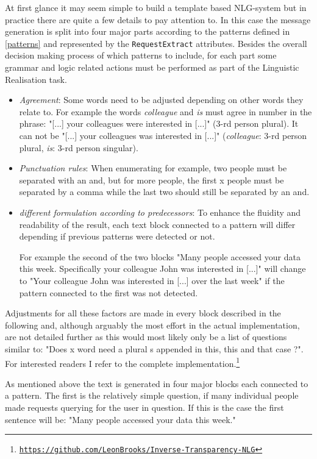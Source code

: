 \documentclass[sigconf,obeyspaces]{acmart}
\begin{document}
At first glance it may seem simple to build a template based NLG-system but in practice there are quite a few details to pay attention to. In this case the message generation is split into four major parts according to the patterns defined in \ref{patterns} and represented by the \texttt{RequestExtract} attributes. Besides the overall decision making process of which patterns to include, for each part some grammar and logic related actions must be performed as part of the Linguistic Realisation task.
\begin{itemize}
    \item \emph{Agreement}: Some words need to be adjusted depending on other words they relate to. For example the words \emph{colleague} and \emph{is} must agree in number in the phrase: "[...] your colleagues were interested in [...]" (3-rd person plural). It can not be "[...] your colleagues was interested in [...]" (\emph{colleague}: 3-rd person plural, \emph{is}: 3-rd person singular).
    \item \emph{Punctuation rules}: When enumerating for example, two people must be separated with an and, but for more people, the first x people must be separated by a comma while the last two should still be separated by an and.
    \item \emph{different formulation according to predecessors}: To enhance the fluidity and readability of the result, each text block connected to a pattern will differ depending if previous patterns were detected or not. 
    
    For example the second of the two blocks "Many people accessed your data this week. Specifically your colleague John was interested in [...]" will change to "Your colleague John was interested in [...] over the last week" if the pattern connected to the first was not detected.
\end{itemize}
Adjustments for all these factors are made in every block described in the following and, although arguably the most effort in the actual implementation,  are not detailed further as this would most likely only be a list of questions similar to: "Does x word need a plural s appended in this, this and that case ?". For interested readers I refer to the complete implementation.\footnote{\texttt{\url{https://github.com/LeonBrooks/Inverse-Transparency-NLG}}}

As mentioned above the text is generated in four major blocks each connected to a pattern. The first is the relatively simple question, if many individual people made requests querying for the user in question. If this is the case the first sentence will be: "Many people accessed your data this week."
\end{document}
